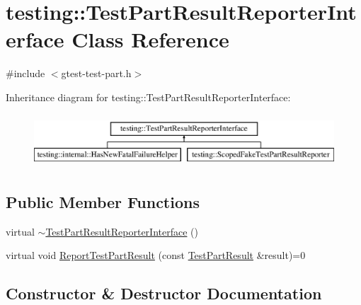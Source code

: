 \hypertarget{classtesting_1_1_test_part_result_reporter_interface}{}\section{testing\+::Test\+Part\+Result\+Reporter\+Interface Class Reference}
\label{classtesting_1_1_test_part_result_reporter_interface}


{\ttfamily \#include $<$gtest-\/test-\/part.\+h$>$}

Inheritance diagram for testing\+::Test\+Part\+Result\+Reporter\+Interface\+:\begin{figure}[H]
\begin{center}
\leavevmode
\includegraphics[height=2.000000cm]{classtesting_1_1_test_part_result_reporter_interface}
\end{center}
\end{figure}
\subsection*{Public Member Functions}
\begin{DoxyCompactItemize}
\item 
virtual \mbox{\hyperlink{classtesting_1_1_test_part_result_reporter_interface_a338b51591ed654f84dc0feaaf2b66917}{$\sim$\+Test\+Part\+Result\+Reporter\+Interface}} ()
\item 
virtual void \mbox{\hyperlink{classtesting_1_1_test_part_result_reporter_interface_aa2f920e7a5a0a6d0faf19e3727928c22}{Report\+Test\+Part\+Result}} (const \mbox{\hyperlink{classtesting_1_1_test_part_result}{Test\+Part\+Result}} \&result)=0
\end{DoxyCompactItemize}


\subsection{Constructor \& Destructor Documentation}
\mbox{\label{classtesting_1_1_test_part_result_reporter_interface_a338b51591ed654f84dc0feaaf2b66917}} 
